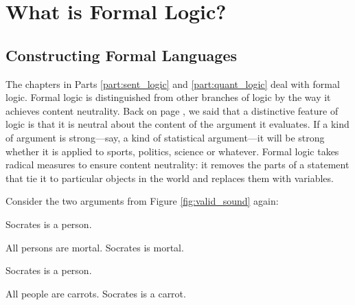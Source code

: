 \chapter{What is Formal Logic?}
\label{chap:whatisformallogic}
\setlength{\parindent}{1em}


\section{Constructing Formal Languages}


The chapters in 
{Parts  %
{\ref{part:sent_logic} and \ref{part:quant_logic}}} %
deal with formal logic. Formal logic is distinguished from other branches of logic by the way it achieves content neutrality. Back on page \pageref{def:content_neutrality}, we said that a distinctive feature of logic is that it is neutral about the content of the argument it evaluates. If a kind of argument is strong---say, a kind of statistical argument---it will be strong whether it is applied to sports, politics, science or whatever. Formal logic takes radical measures to ensure content neutrality: it removes the parts of a statement that tie it to particular objects in the world and replaces them with variables.

Consider the two arguments from Figure \ref{fig:valid_sound} again:
\begin{multicols}{2}
\begin{earg*}
\item Socrates is a person.
\item All persons are mortal.
\itemc Socrates is mortal.
\end{earg*}

\begin{earg*}
\item Socrates is a person.
\item All people are carrots.
\itemc Socrates is a carrot.
\end{earg*}

\end{multicols}

